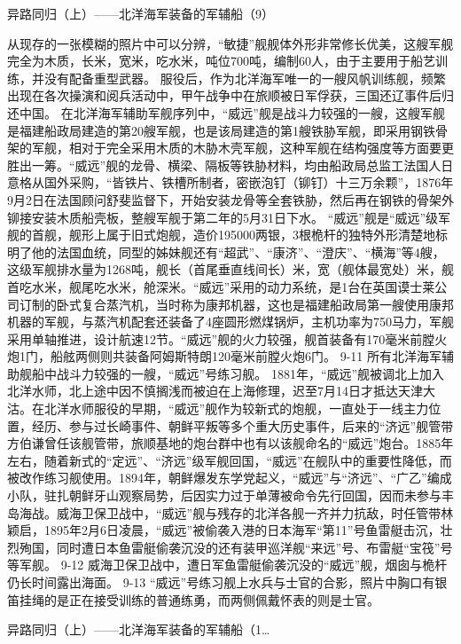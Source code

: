 \documentclass[12pt,UTF8]{ctexbook}
\begin{document}
异路同归（上）——北洋海军装备的军辅船（9）

从现存的一张模糊的照片中可以分辨，“敏捷”舰舰体外形非常修长优美，这艘军舰完全为木质，长米，宽米，吃水米，吨位700吨，编制60人，由于主要用于船艺训练，并没有配备重型武器。 服役后，作为北洋海军唯一的一艘风帆训练舰，频繁出现在各次操演和阅兵活动中，甲午战争中在旅顺被日军俘获，三国还辽事件后归还中国。
在北洋海军辅助军舰序列中，“威远”舰是战斗力较强的一艘，这艘军舰是福建船政局建造的第20艘军舰，也是该局建造的第1艘铁胁军舰，即采用钢铁骨架的军舰，相对于完全采用木质的木胁木壳军舰，这种军舰在结构强度等方面要更胜出一筹。“威远”舰的龙骨、横梁、隔板等铁胁材料，均由船政局总监工法国人日意格从国外采购，“皆铁片、铁槽所制者，密嵌泡钉（铆钉）十三万余颗”，1876年9月2日在法国顾问舒斐监督下，开始安装龙骨等全套铁胁，然后再在钢铁的骨架外铆接安装木质船壳板，整艘军舰于第二年的5月31日下水。
“威远”舰是“威远”级军舰的首舰，舰形上属于旧式炮舰，造价195000两银，3根桅杆的独特外形清楚地标明了他的法国血统，同型的姊妹舰还有“超武”、“康济”、“澄庆”、“横海”等4艘，这级军舰排水量为1268吨，舰长（首尾垂直线间长）米，宽（舰体最宽处）米，舰首吃水米，舰尾吃水米，舱深米。“威远”采用的动力系统，是1台在英国谟士莱公司订制的卧式复合蒸汽机，当时称为康邦机器，这也是福建船政局第一艘使用康邦机器的军舰，与蒸汽机配套还装备了4座圆形燃煤锅炉，主机功率为750马力，军舰采用单轴推进，设计航速12节。“威远”舰的火力较强，舰首装备有170毫米前膛火炮1门，船舷两侧则共装备阿姆斯特朗120毫米前膛火炮6门。
9-11
所有北洋海军辅助舰船中战斗力较强的一艘，“威远”号练习舰。
1881年，“威远”舰被调北上加入北洋水师，北上途中因不慎搁浅而被迫在上海修理，迟至7月14日才抵达天津大沽。在北洋水师服役的早期，“威远”舰作为较新式的炮舰，一直处于一线主力位置，经历、参与过长崎事件、朝鲜平叛等多个重大历史事件，后来的“济远”舰管带方伯谦曾任该舰管带，旅顺基地的炮台群中也有以该舰命名的“威远”炮台。1885年左右，随着新式的“定远”、“济远”级军舰回国，“威远”在舰队中的重要性降低，而被改作练习舰使用。1894年，朝鲜爆发东学党起义，“威远”与“济远”、“广乙”编成小队，驻扎朝鲜牙山观察局势，后因实力过于单薄被命令先行回国，因而未参与丰岛海战。威海卫保卫战中，“威远”舰与残存的北洋各舰一齐并力抗敌，时任管带林颖启，1895年2月6日凌晨，“威远”被偷袭入港的日本海军“第11”号鱼雷艇击沉，壮烈殉国，同时遭日本鱼雷艇偷袭沉没的还有装甲巡洋舰“来远”号、布雷艇“宝筏”号等军舰。
9-12
威海卫保卫战中，遭日军鱼雷艇偷袭沉没的“威远”舰，烟囱与桅杆仍长时间露出海面。
9-13
“威远”号练习舰上水兵与士官的合影，照片中胸口有银笛挂绳的是正在接受训练的普通练勇，而两侧佩戴怀表的则是士官。




异路同归（上）——北洋海军装备的军辅船（1…
\end{document}
